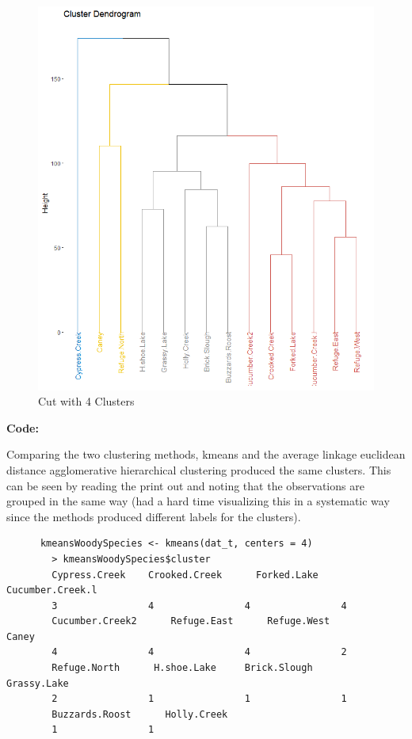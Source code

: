 \documentclass[12pt]{article}
\makeatletter
\theoremstyle{homework}
\newenvironment{exercise}[1]
{\def\@currentlabel{#1}\exercisecore}
{\endexercisecore}
\makeatother
\begin{document}
\begin{exercise}{2}
\begin{enumerate}
    \begin{figure}[H]
      \begin{center}
        \caption{Cut with 4 Clusters}
      \includegraphics[width = .70\textwidth]{Rplot08.png}
      \end{center}
  \end{figure}

  \textbf{Code:}
  \begin{center}
  
  \end{center}

  Comparing the two clustering methods, kmeans and the average linkage euclidean distance agglomerative hierarchical clustering produced the same clusters. This 
  can be seen by reading the print out and noting that the observations are grouped in the same way (had a hard time visualizing this in a systematic way since the methods produced different labels for the clusters).
  

  \begin{footnotesize}
    \begin{verbatim}
      kmeansWoodySpecies <- kmeans(dat_t, centers = 4)
        > kmeansWoodySpecies$cluster
        Cypress.Creek    Crooked.Creek      Forked.Lake Cucumber.Creek.l 
        3                4                4                4 
        Cucumber.Creek2      Refuge.East      Refuge.West            Caney 
        4                4                4                2 
        Refuge.North      H.shoe.Lake     Brick.Slough      Grassy.Lake 
        2                1                1                1 
        Buzzards.Roost      Holly.Creek 
        1                1 
    

\end{verbatim}
\end{footnotesize}
\end{enumerate}
\end{exercise}
\end{document}
